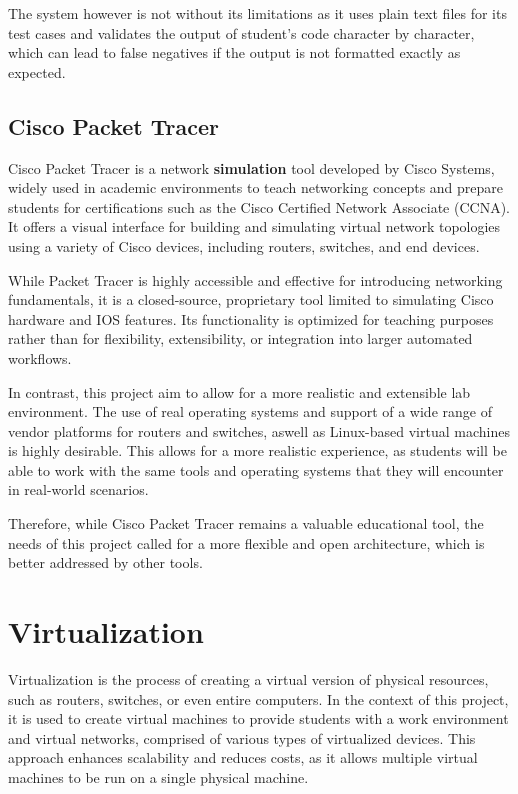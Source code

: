 The system however is not without its limitations as it uses plain text files for its test cases and validates the output 
of student's code character by character, which can lead to false negatives if the output is not formatted exactly as
expected.

\subsection{Cisco Packet Tracer}

Cisco Packet Tracer is a network \textbf{simulation} tool developed by Cisco Systems, widely used in academic environments 
to teach networking concepts and prepare students for certifications such as the Cisco Certified Network Associate (CCNA). 
It offers a visual interface for building and simulating virtual network topologies using a variety of Cisco devices, 
including routers, switches, and end devices.

While Packet Tracer is highly accessible and effective for introducing networking fundamentals, it is a closed-source, 
proprietary tool limited to simulating Cisco hardware and IOS features. Its functionality is optimized for teaching 
purposes rather than for flexibility, extensibility, or integration into larger automated workflows.

In contrast, this project aim to allow for a more realistic and extensible lab environment. The use of real operating 
systems and support of a wide range of vendor platforms for routers and switches, aswell as Linux-based virtual machines 
is highly desirable. This allows for a more realistic experience, as students will be able to work with the same tools and 
operating systems that they will encounter in real-world scenarios.

Therefore, while Cisco Packet Tracer remains a valuable educational tool, the needs of this project called for a more 
flexible and open architecture, which is better addressed by other tools.

\section{Virtualization}
Virtualization is the process of creating a virtual version of physical resources, such as routers, switches, or even
entire computers. In the context of this project, it is used to create virtual machines to provide students with a 
work environment and virtual networks, comprised of various types of virtualized devices. This approach enhances scalability 
and reduces costs, as it allows multiple virtual machines to be run on a single physical machine.

